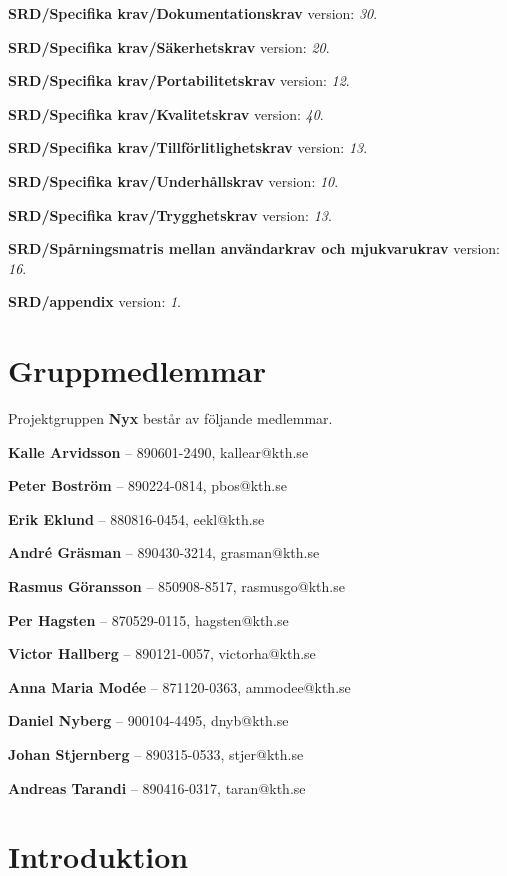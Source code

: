 \documentclass[a4paper, twoside, 11pt, titlepage]{article}
\begin{document}
\textbf{SRD/Specifika krav/Dokumentationskrav} version: \emph{30}.

\textbf{SRD/Specifika krav/Säkerhetskrav} version: \emph{20}.

\textbf{SRD/Specifika krav/Portabilitetskrav} version: \emph{12}.

\textbf{SRD/Specifika krav/Kvalitetskrav} version: \emph{40}.

\textbf{SRD/Specifika krav/Tillförlitlighetskrav} version: \emph{13}.

\textbf{SRD/Specifika krav/Underhållskrav} version: \emph{10}.

\textbf{SRD/Specifika krav/Trygghetskrav} version: \emph{13}.

\textbf{SRD/Spårningsmatris mellan användarkrav och mjukvarukrav} version: \emph{16}.

\textbf{SRD/appendix} version: \emph{1}.

\clearpage
\section*{Gruppmedlemmar}


Projektgruppen \textbf{Nyx} består av följande medlemmar.

\textbf{Kalle Arvidsson} -- 890601-2490, kallear@kth.se

\textbf{Peter Boström} -- 890224-0814, pbos@kth.se

\textbf{Erik Eklund} -- 880816-0454, eekl@kth.se 

\textbf{André Gräsman} -- 890430-3214, grasman@kth.se 

\textbf{Rasmus Göransson} -- 850908-8517, rasmusgo@kth.se 

\textbf{Per Hagsten} -- 870529-0115, hagsten@kth.se

\textbf{Victor Hallberg} -- 890121-0057, victorha@kth.se

\textbf{Anna Maria Modée} -- 871120-0363, ammodee@kth.se 

\textbf{Daniel Nyberg} -- 900104-4495, dnyb@kth.se 

\textbf{Johan Stjernberg} -- 890315-0533, stjer@kth.se

\textbf{Andreas Tarandi} -- 890416-0317, taran@kth.se

\clearpage \tableofcontents \clearpage

\clearpage
\section{Introduktion}
\end{document}
